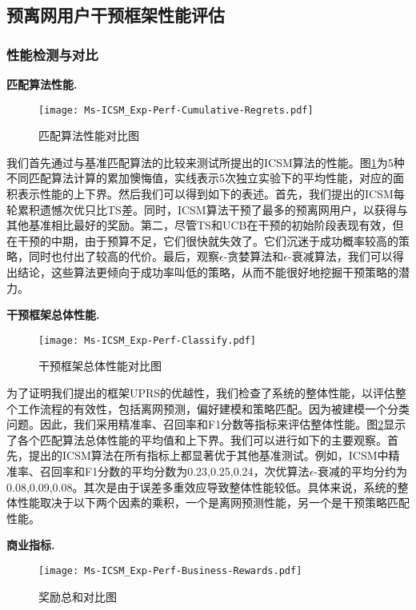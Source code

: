 \subsection{预离网用户干预框架性能评估}
\subsubsection{性能检测与对比}
\textbf{匹配算法性能.}

\begin{figure}[hbt]
	\centering
	\texttt{[image: Ms-ICSM\_Exp-Perf-Cumulative-Regrets.pdf]}
	\caption{匹配算法性能对比图}
	\label{Fig:Exp-Perf-Cumulative-Regrets}
\end{figure}
我们首先通过与基准匹配算法的比较来测试所提出的ICSM算法的性能。图\ref{Fig:Exp-Perf-Cumulative-Regrets}为5种不同匹配算法计算的累加懊悔值，实线表示5次独立实验下的平均性能，对应的面积表示性能的上下界。然后我们可以得到如下的表述。首先，我们提出的ICSM每轮累积遗憾次优只比TS差。同时，ICSM算法干预了最多的预离网用户，以获得与其他基准相比最好的奖励。第二，尽管TS和UCB在干预的初始阶段表现有效，但在干预的中期，由于预算不足，它们很快就失效了。它们沉迷于成功概率较高的策略，同时也付出了较高的代价。最后，观察$\epsilon$-贪婪算法和$\epsilon$-衰减算法，我们可以得出结论，这些算法更倾向于成功率叫低的策略，从而不能很好地挖掘干预策略的潜力。


\textbf{干预框架总体性能.}\par
\begin{figure}[hbt]
	\centering
	\texttt{[image: Ms-ICSM\_Exp-Perf-Classify.pdf]}
	\caption{干预框架总体性能对比图}
	\label{Fig:Exp-Perf-Classify}
\end{figure}
为了证明我们提出的框架UPRS的优越性，我们检查了系统的整体性能，以评估整个工作流程的有效性，包括离网预测，偏好建模和策略匹配。因为被建模一个分类问题。因此，我们采用精准率、召回率和F1分数等指标来评估整体性能。图\ref{Fig:Exp-Perf-Classify}显示了各个匹配算法总体性能的平均值和上下界。我们可以进行如下的主要观察。首先，提出的ICSM算法在所有指标上都显著优于其他基准测试。例如，ICSM中精准率、召回率和F1分数的平均分数为{0.23,0.25,0.24}，次优算法$\epsilon$-衰减的平均分约为{0.08,0.09,0.08}。其次是由于误差多重效应导致整体性能较低。具体来说，系统的整体性能取决于以下两个因素的乘积，一个是离网预测性能，另一个是干预策略匹配性能。



\textbf{商业指标.}


\begin{figure}[hbt]
	\centering
	\texttt{[image: Ms-ICSM\_Exp-Perf-Business-Rewards.pdf]}
	\caption{奖励总和对比图}
	\label{Fig:Exp-Perf-Business-Rewards}
\end{figure}

